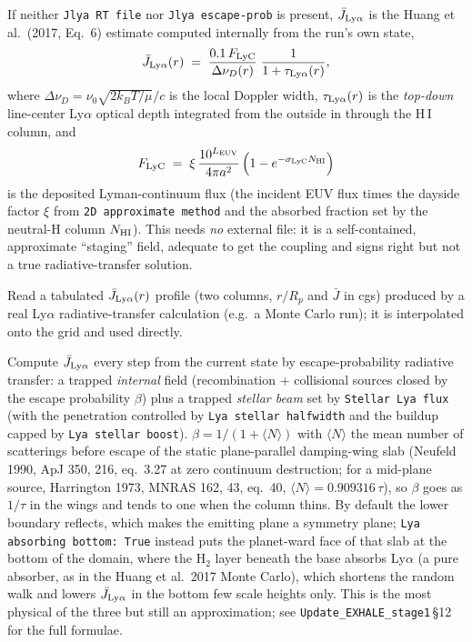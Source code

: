 \documentclass[english,a4paper]{my_memo}
\begin{document}
\begin{description}\itemsep3pt
\item[\textmd{(mode 0) Parameterized: the default with no external input.}]
  If neither \texttt{Jlya RT file} nor \texttt{Jlya escape-prob} is present,
  $\bar J_{\rm Ly\alpha}$ is the Huang et al.\ (2017, Eq.~6) estimate computed
  internally from the run's own state,
  \[
  \bar J_{\rm Ly\alpha}(r) \;=\; \frac{0.1\,F_{\rm LyC}}{\Delta\nu_D(r)}
        \;\frac{1}{1+\tau_{\rm Ly\alpha}(r)},
  \]
  where $\Delta\nu_D=\nu_0\sqrt{2k_BT/\mu}/c$ is the local Doppler width,
  $\tau_{\rm Ly\alpha}(r)$ is the \emph{top-down} line-center Ly$\alpha$ optical
  depth integrated from the outside in through the H\,I column, and
  \[
  F_{\rm LyC} \;=\; \xi\,\frac{10^{L_{\rm EUV}}}{4\pi a^2}\,
        \Big(1-e^{-\sigma_{\rm LyC} N_{\rm HI}}\Big)
  \]
  is the deposited Lyman-continuum flux (the incident EUV flux times the dayside
  factor $\xi$ from \texttt{2D approximate method} and the absorbed fraction set by
  the neutral-H column $N_{\rm HI}$). This needs \emph{no} external file: it is a
  self-contained, approximate ``staging'' field, adequate to get the coupling and
  signs right but not a true radiative-transfer solution.
\item[\textmd{(mode 1) External RT file: \texttt{Jlya RT file: <path>}.}]
  Read a tabulated $\bar J_{\rm Ly\alpha}(r)$ profile (two columns, $r/R_p$ and
  $\bar J$ in cgs) produced by a real Ly$\alpha$ radiative-transfer calculation
  (e.g.\ a Monte Carlo run); it is interpolated onto the grid and used directly.
\item[\textmd{(mode 2) In-line escape probability: \texttt{Jlya escape-prob: True}.}]
  Compute $\bar J_{\rm Ly\alpha}$ every step from the current state by
  escape-probability radiative transfer: a
  trapped \emph{internal} field (recombination + collisional sources closed by the
  escape probability $\beta$) plus a trapped \emph{stellar beam} set by
  \texttt{Stellar Lya flux} (with the penetration controlled by \texttt{Lya stellar
  halfwidth} and the buildup capped by \texttt{Lya stellar boost}).
  $\beta = 1/(1+\langle N\rangle)$ with $\langle N\rangle$ the mean number of
  scatterings before escape of the static plane-parallel damping-wing slab
  (Neufeld 1990, ApJ 350, 216, eq.~3.27 at zero continuum destruction; for a
  mid-plane source, Harrington 1973, MNRAS 162, 43, eq.~40,
  $\langle N\rangle = 0.909316\,\tau$), so $\beta$ goes as $1/\tau$ in the wings
  and tends to one when the column thins. By default the lower boundary
  reflects, which makes the emitting plane a symmetry plane;
  \texttt{Lya absorbing bottom: True} instead puts the planet-ward face of that
  slab at the bottom of the domain, where the H$_2$ layer beneath the base
  absorbs Ly$\alpha$ (a pure absorber, as in the Huang et al.\ 2017 Monte
  Carlo), which shortens the random walk and lowers $\bar J_{\rm Ly\alpha}$
  in the bottom few scale heights only. This is the most
  physical of the three but still an approximation; see
  \texttt{Update\_EXHALE\_stage1}\,\S12 for the full formulae.
\end{description}
\end{document}
